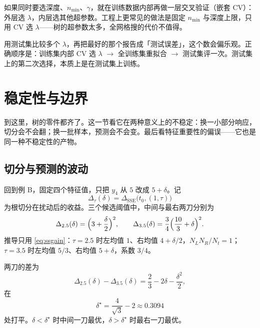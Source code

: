 \documentclass[11pt,a4paper,fontset=windows,zihao=-4]{ctexart}
\DeclareMathOperator{\SSE}{SSE}
\begin{document}
\begin{add}[还有一层超参数怎么办]
如果同时要选深度、$n_{\min}$、$\gamma$，就在训练数据内部再做一层交叉验证（嵌套 CV）：外层选 $\lambda$，内层选其他超参数。工程上更常见的做法是固定 $n_{\min}$ 与深度上限，只用 CV 选 $\lambda$——树的超参数太多，全网格搜的代价不值得。
\end{add}

\begin{warn}[测试集只能用一次]
用测试集比较多个 $\lambda$，再把最好的那个报告成「测试误差」，这个数会偏乐观。正确顺序是：训练集内部 CV 选 $\lambda$ $\to$ 全训练集重拟合 $\to$ 测试集评一次。测试集上的第二次选择，本质上是在测试集上训练。
\end{warn}


\section{稳定性与边界}

到这里，树的零件都齐了。这一节看它在两种意义上的不稳定：换一小部分响应，切分会不会翻；换一批样本，预测会不会变。最后看特征重要性的偏误——它也是同一种不稳定性的产物。

\subsection{切分与预测的波动}

回到例 B，固定四个特征值，只把 $y_4$ 从 $5$ 改成 $5+\delta$。记
\[
  \Delta_\tau(\delta)=\Delta_{\SSE}\bigl(t_0,(1,\tau)\bigr)
\]
为根切分在扰动后的收益。三个候选阈值中，中间与最右两刀分别为
\begin{equation}
  \Delta_{2.5}(\delta)=\Bigl(3+\frac{\delta}{2}\Bigr)^2,
  \qquad
  \Delta_{3.5}(\delta)=\frac34\Bigl(\frac{10}{3}+\delta\Bigr)^2 .
  \label{eq:perturb}
\end{equation}
推导只用 \eqref{eq:ssgain}：$\tau=2.5$ 时左均值 $1$、右均值 $4+\delta/2$，$N_LN_R/N_t=1$；$\tau=3.5$ 时左均值 $5/3$、右均值 $5+\delta$，系数 $3/4$。

两刀的差为
\begin{equation}
  \Delta_{2.5}(\delta)-\Delta_{3.5}(\delta)
  =\frac23-2\delta-\frac{\delta^2}{2},
  \label{eq:diffperturb}
\end{equation}
在
\[
  \delta^\star=\frac{4}{\sqrt3}-2\approx0.3094
\]
处打平。$\delta<\delta^\star$ 时中间一刀最优，$\delta>\delta^\star$ 时最右一刀最优。
\end{document}

